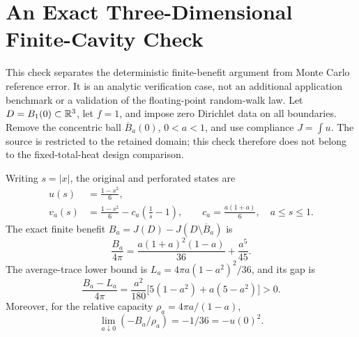 \section{An Exact Three-Dimensional Finite-Cavity Check}
\label{app:exactcavity}

This check separates the deterministic finite-benefit argument from Monte
Carlo reference error. It is an analytic verification case, not an additional
application benchmark or a validation of the floating-point random-walk law.
Let $D=B_1(0)\subset\mathbb{R}^3$, let $f=1$, and impose zero Dirichlet data on all
boundaries. Remove the concentric ball $\overline B_a(0)$, $0<a<1$, and use
compliance $J=\int u$. The source is restricted to the retained domain; this
check therefore does not belong to the fixed-total-heat design comparison.

\begin{proposition}
\label{prop:exactcavity}
Writing $s=|x|$, the original and perforated states are
\begin{align}
 u(s)&=\frac{1-s^2}{6},\\
 v_a(s)&=\frac{1-s^2}{6}-c_a\left(\frac1s-1\right),
 \qquad c_a=\frac{a(1+a)}6,\quad a\le s\le1.
\end{align}
The exact finite benefit $B_a=J(D)-J(D\setminus\overline B_a)$ is
\begin{equation}
 \frac{B_a}{4\pi}
 =\frac{a(1+a)^2(1-a)}{36}+\frac{a^5}{45}.
 \label{eq:exactcavitybenefit}
\end{equation}
The average-trace lower bound is
$L_a=4\pi a(1-a^2)^2/36$, and its gap is
\begin{equation}
 \frac{B_a-L_a}{4\pi}
 =\frac{a^2}{180}\bigl[5(1-a^2)+a(5-a^2)\bigr]>0.
 \label{eq:exactcavitygap}
\end{equation}
Moreover, for the relative capacity $\rho_a=4\pi a/(1-a)$,
\[\lim_{a\downarrow0}(-B_a/\rho_a)=-1/36=-u(0)^2.\]
\end{proposition}

